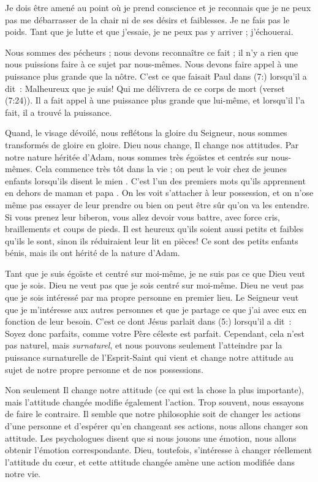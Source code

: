 Je dois être amené au point où je prend conscience et
 je reconnais que je ne peux pas me débarrasser de la chair
 ni de ses désirs et faiblesses.
 Je ne fais pas le poids. Tant que je lutte et que j'essaie,
 je ne peux pas y arriver ; j'échouerai.

Nous sommes des pécheurs ; nous devons reconnaître ce fait ;
 il n'y a rien que nous puissions faire à ce sujet par nous-mêmes.
 Nous devons faire appel à une puissance plus grande que la nôtre.
 C'est ce que faisait Paul dans (7:) lorsqu'il a dit~:
 \og Malheureux que je suis! Qui me délivrera de ce corps de mort \fg{}
 (verset (7:24)).
 Il a fait appel à une puissance plus grande que lui-même,
 et lorsqu'il l'a fait, il a trouvé la puissance.

Quand, le visage dévoilé, nous reflétons la gloire du Seigneur,
 nous sommes transformés de gloire en gloire.
 Dieu nous change, Il change nos attitudes.
 Par notre nature héritée d'Adam, nous sommes très égoïstes
 et centrés sur nous-mêmes.
 Cela commence très tôt dans la vie ; on peut le voir chez de jeunes enfants
 lorsqu'ils disent \og le mien \fg{}.
 C'est l'un des premiers mots qu'ils apprennent
 en dehors de \og maman \fg{} et \og papa \fg{}.
 On les voit s'attacher à leur possession, et on n'ose même pas
 essayer de leur prendre ou bien on peut être sûr qu'on va les entendre.
 Si vous prenez leur biberon, vous allez devoir vous battre,
 avec force cris, braillements et coups de pieds.
 Il est heureux qu'ils soient aussi petits et faibles qu'ils le sont,
 sinon ils réduiraient leur lit en pièces!
 Ce sont des petits enfants bénis,
 mais ils ont hérité de la nature d'Adam.

Tant que je suis égoïste et centré sur moi-même,
 je ne suis pas ce que Dieu veut que je sois.
 Dieu ne veut pas que je sois centré sur moi-même.
 Dieu ne veut pas que je sois intéressé par ma propre personne
 en premier lieu.
 Le Seigneur veut que je m'intéresse aux autres personnes et que
 je partage ce que j'ai avec eux en fonction de leur besoin.
 C'est ce dont Jésus parlait dans (5:) lorsqu'il a dit~:
 \og Soyez donc parfaits, comme votre Père céleste est parfait. \fg{}
 Cependant, cela n'est pas naturel, mais \emph{surnaturel}, et nous pouvons seulement
 l'atteindre par la puissance surnaturelle de l'Esprit-Saint
 qui vient et change notre attitude au sujet de notre propre personne
 et de nos possessions.

Non seulement Il change notre attitude (ce qui est la chose la plus importante),
 mais l'attitude changée modifie également l'action.
 Trop souvent, nous essayons de faire le contraire.
 Il semble que notre philosophie soit de changer les actions d'une personne
 et d'espérer qu'en changeant ses actions, nous allons changer son attitude.
 Les psychologues disent que si nous jouons une émotion, nous allons obtenir
 l'émotion correspondante.
 Dieu, toutefois, s'intéresse à changer réellement l'attitude du cœur,
 et cette attitude changée amène une action modifiée dans notre vie.


